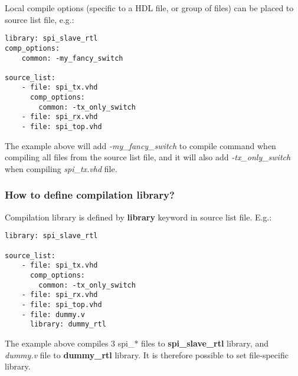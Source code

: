 \documentclass{tropic_design_spec}
\begin{document}
\vspace{3mm}

Local compile options (specific to a HDL file, or group of files) can be placed to
source list file, e.g.:

\begin{lstlisting}
library: spi_slave_rtl
comp_options:
    common: -my_fancy_switch

source_list:
    - file: spi_tx.vhd
      comp_options:
        common: -tx_only_switch
    - file: spi_rx.vhd
    - file: spi_top.vhd
\end{lstlisting}

The example above will add \textit{-my_fancy_switch} to compile command when
compiling all files from the source list file, and it will also add
\textit{-tx_only_switch} when compiling \textit{spi_tx.vhd} file.



\subsubsection{How to define compilation library?}
\label{sec:how-to-define-compilation-library}

Compilation library is defined by \textbf{library} keyword in source list file. E.g.:

\begin{lstlisting}
library: spi_slave_rtl

source_list:
    - file: spi_tx.vhd
      comp_options:
        common: -tx_only_switch
    - file: spi_rx.vhd
    - file: spi_top.vhd
    - file: dummy.v
      library: dummy_rtl
\end{lstlisting}

The example above compiles 3 spi_* files to \textbf{spi_slave_rtl} library, and
\textit{dummy.v} file to \textbf{dummy_rtl} library. It is therefore possible to
set file-specific library.

\end{document}
